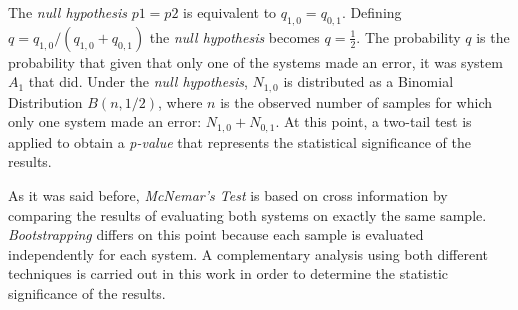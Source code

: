 The \textit{null hypothesis} $p1=p2$ is equivalent to $q_{1,0}=q_{0,1}$. Defining
$q=q_{1,0}/(q_{1,0}+q_{0,1})$ the \textit{null hypothesis} becomes $q=\frac{1}{2}$.
The probability $q$ is the probability that given that only one of the systems
made an error, it was system $A_{1}$ that did. Under the \textit{null hypothesis},
$N_{1,0}$ is distributed as a Binomial Distribution $B(n,1/2)$, where $n$ is
the observed number of samples for which only one system made an error: $N_{1,0}+N_{0,1}$.
At this point, a two-tail test is applied to obtain a \textit{p-value} that represents
the statistical significance of the results.

As it was said before,
\textit{McNemar's Test} is based on cross information by comparing the results of
evaluating both systems on exactly the same sample. \textit{Bootstrapping} differs on this
point because each sample is evaluated independently for each system.
A complementary analysis using both different techniques is carried out in this work
in order to determine the statistic significance of the results.
